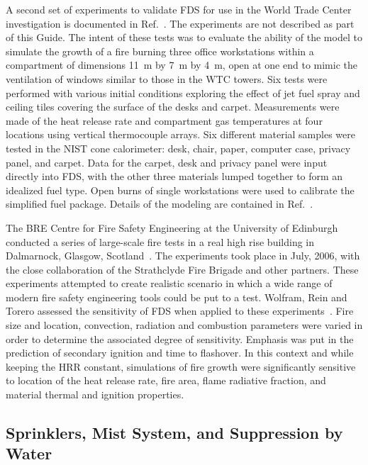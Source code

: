 A second set of experiments to validate FDS for use in the World Trade Center  investigation is  documented  in Ref.~\cite{NIST_NCSTAR_1-5E}.  The experiments
are not described as part of this Guide. The intent
of  these tests  was to  evaluate the ability  of the  model to simulate the growth  of a fire burning three  office workstations within a compartment of
dimensions 11~m by 7~m by 4~m, open at one end to mimic the ventilation  of windows similar to  those in  the WTC towers. Six tests  were performed
with various  initial conditions  exploring the effect of jet fuel spray and ceiling tiles covering the surface of the desks and carpet. Measurements
were  made of the heat release rate and compartment  gas   temperatures  at  four   locations  using  vertical thermocouple arrays. Six different
material samples were tested in the NIST  cone calorimeter:  desk,  chair, paper,  computer case,  privacy panel, and  carpet. Data for the  carpet,
desk and  privacy panel were input directly into FDS, with the other three materials lumped together to form an  idealized fuel type.  Open burns of
single  workstations were used to  calibrate the simplified fuel  package. Details of the modeling are contained in Ref.~\cite{NIST_NCSTAR_1-5F}.


The BRE Centre for Fire Safety Engineering at the University of Edinburgh conducted a series of large-scale fire tests in a real high rise building in Dalmarnock, Glasgow,
Scotland~\cite{Rein:Dalmarnock,Rein:FSJ}.
The experiments took place in July, 2006, with the close collaboration of the Strathclyde Fire Brigade and other partners.
These experiments attempted to create realistic scenario in which a wide range of modern fire safety engineering tools could be put to a test.
Wolfram, Rein and Torero assessed the sensitivity of FDS when applied to these experiments~\cite{Wolfram:IAFSS9}. Fire size and
location, convection, radiation and combustion parameters were varied in order to determine the associated
degree of sensitivity. Emphasis was put in the prediction of secondary ignition and time to flashover. In this
context and while keeping the HRR constant, simulations of fire growth were significantly sensitive to
location of the heat release rate, fire area, flame radiative fraction, and material thermal and ignition
properties.



\subsection{Sprinklers, Mist System, and Suppression by Water}


